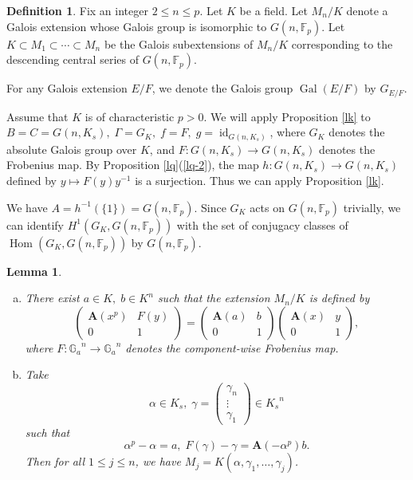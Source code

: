 \documentclass[10pt,a4paper]{amsart}
\numberwithin{equation}{section}
\newcommand{\Gal}{\operatorname{Gal}}
\theoremstyle{plain}
\newtheorem{lemm}[theo]{Lemma}
\theoremstyle{definition}
\newtheorem{defi}[theo]{Definition}
\begin{document}
\begin{defi}\label{dfd}
  Fix an integer $2\leq n\leq p$. Let $K$ be a field. Let $M_n/K$ denote a Galois extension whose Galois group is isomorphic to $G(n,\mathbb{F}_p)$. Let $K\subset M_1\subset\cdots\subset M_n$ be the Galois subextensions of $M_n/K$ corresponding to the descending central series of $G(n,\mathbb{F}_p)$.
  \end{defi}

  For any Galois extension $E/F$, we denote the Galois group $\Gal(E/F)$ by $G_{E/F}$. 

Assume that $K$ is of characteristic $p>0$. We will apply Proposition \ref{lk} to $B=C=G(n,K_s),\;\Gamma=G_K,\;f=F,\;g=\operatorname{id}_{G(n,K_s)}$, where $G_K$ denotes the absolute Galois group over $K$, and $F:G(n,K_s)\to G(n,K_s)$ denotes the Frobenius map.  By Proposition \ref{lq}(\ref{lq-2}), the map $h:G(n,K_s)\to G(n,K_s)$ defined by $y\mapsto F(y)y^{-1}$ is a surjection. Thus we can apply Proposition \ref{lk}.

We have $A=h^{-1}(\{1\})=G(n,\mathbb{F}_p)$. Since $G_K$ acts on $G(n,\mathbb{F}_p)$ trivially, we can identify $H^1(G_K,G(n,\mathbb{F}_p))$ with the set of conjugacy classes of $\operatorname{Hom}(G_K,G(n,\mathbb{F}_p))$ by $G(n,\mathbb{F}_p)$. 
  
\begin{lemm}\label{lag}
  \begin{enumerate}[(a)]
    \item\label{lag-1} There exist $a\in K,\;b\in K^{n}$ such that the extension $M_n/K$ is defined by 
\begin{equation}\label{ea}
\begin{pmatrix}
  \mathbf{A}(x^p)&F(y)\\
  0&1
\end{pmatrix}
=
\begin{pmatrix}
  \mathbf{A}(a)&b\\
  0&1
\end{pmatrix}
\begin{pmatrix}
  \mathbf{A}(x)&y\\
  0&1
\end{pmatrix},
\end{equation}
where $F:{\mathbb{G}_a}^n\to{\mathbb{G}_a}^n$ denotes the component-wise Frobenius map.
\item\label{lag-2} Take
  \begin{equation}
  \alpha\in K_s,\;\gamma=\begin{pmatrix}
    \gamma_n\\
    \vdots\\
    \gamma_1
\end{pmatrix}\in {K_s}^n
  \end{equation}
  such that
\begin{equation}
\alpha^p-\alpha=a,\;F(\gamma)-\gamma=\mathbf{A}(-\alpha^p)b.
    \end{equation}
    Then for all $1\leq j\leq n$, we have $M_j=K(\alpha,\gamma_1,\ldots,\gamma_j)$.
    \end{enumerate}
  \end{lemm}
\end{document}

